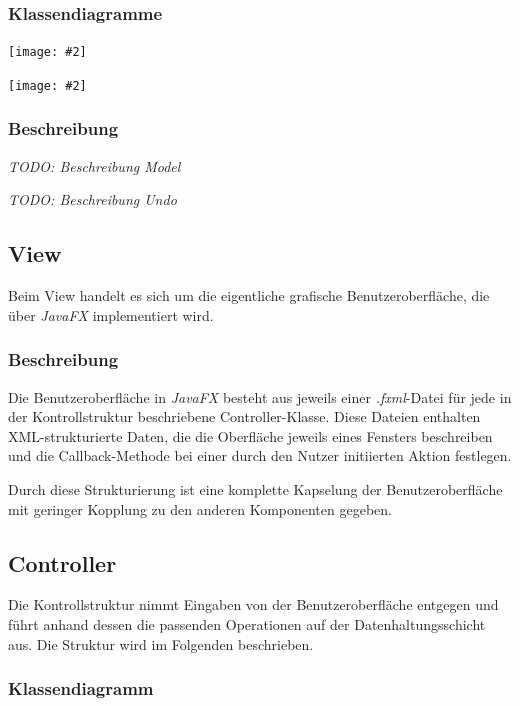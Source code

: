 \documentclass[11pt]{article}
\newcommand{\includediagram}[2]{
	\begin{center}
		\texttt{[image: \#2]}
	\end{center}
}
\begin{document}
\subsubsection{Klassendiagramme}

\includediagram{1.0}{model-main.png}

\includediagram{1.0}{model-undo.png}

\subsubsection{Beschreibung}

\textit{TODO: Beschreibung Model}

\textit{TODO: Beschreibung Undo}

\subsection{View}

Beim View handelt es sich um die eigentliche grafische Benutzeroberfläche, die über \textit{JavaFX} implementiert wird.

\subsubsection{Beschreibung}

Die Benutzeroberfläche in \textit{JavaFX} besteht aus jeweils einer \textit{.fxml}-Datei für jede in der Kontrollstruktur beschriebene Controller-Klasse. Diese Dateien enthalten XML-strukturierte Daten, die die Oberfläche jeweils eines Fensters beschreiben und die Callback-Methode bei einer durch den Nutzer initiierten Aktion festlegen.

Durch diese Strukturierung ist eine komplette Kapselung der Benutzeroberfläche mit geringer Kopplung zu den anderen Komponenten gegeben.

\subsection{Controller}

Die Kontrollstruktur nimmt Eingaben von der Benutzeroberfläche entgegen und führt anhand dessen die passenden Operationen auf der Datenhaltungsschicht aus. Die Struktur wird im Folgenden beschrieben.

\subsubsection{Klassendiagramm}
\end{document}
